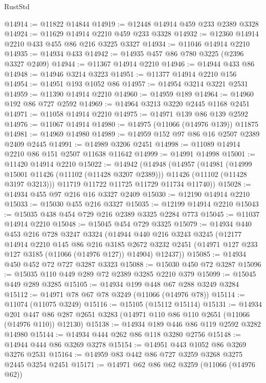 \begin{lexlean}{RustStd}
\begin{coremodule}
@14914 := @11822 @14844
@14919 := @12448 @14914 @459 @233 @2389 @3328
@14924 := @11629 @14914 @2210 @459 @233 @3328
@14932 := @12360 @14914 @2210 @433 @455 @86 @216 @3225 @3327
@14934 := @11046 @14914 @2210
@14935 := @14934 @433
@14942 := @14935 @457 @86 @780 @3225 (@2396 @3327 @2409)
@14944 := @11367 @14914 @2210
@14946 := @14944 @433 @86
@14948 := @14946 @3214 @3223
@14951 := @11377 @14914 @2210 @156
@14954 := @14951 @193 @1052 @86
@14957 := @14954 @3214 @3221 @2531
@14959 := @11390 @14914 @2210
@14960 := @14959 @189
@14964 := @14960 @192 @86 @727 @2592
@14969 := @14964 @3213 @3220 @2445 @1168 @2451
@14971 := @11058 @14914 @2210
@14975 := @14971 @139 @86 @139 @2592
@14976 := @11067 @14914
@14980 := @14975 (@11066 (@14976 @139)) @11875
@14981 := @14969 @14980
@14989 := @14959 @152 @97 @86 @16 @2507 @2389 @2409 @2445
@14991 := @14989 @3206 @2451
@14998 := @11089 @14914 @2210 @86 @151 @2507 @11638 @11642
@14999 := @14991 @14998
@15001 := @11420 @14914 @2210
@15022 := @14942
    (@14948
      (@14957
        (@14981
          (@14999 @15001 @11426 (@11102 (@11428 @3207 @2389)))
          @11426
          (@11102 (@11428 @3197 @3213)))
        @11719
        @11722
        @11725
        @11729
        @11734
        @11740))
@15028 := @14934 @455 @97 @216 @16 @3327 @2409
@15030 := @12190 @14914 @2210
@15033 := @15030 @455 @216 @3327
@15035 := @12199 @14914 @2210
@15043 := @15035 @438 @454 @729 @216 @2389 @3325 @2284 @773
@15045 := @11037 @14914 @2210
@15048 := @15045 @454 @729 @3325
@15079 := @14934
    @440
    @453
    @216
    @728
    @3247
    @3324
    (@14944
      @440
      @216
      @3243
      @3245
      (@12177
        @14914
        @2210
        @145
        @86
        @216
        @3185
        @2672
        @3232
        @2451
        (@14971 @127 @233 @127 @3185 (@11066 (@14976 @127)) @14904)
        @12437))
@15085 := @14934 @450 @452 @72 @727 @3287 @3323
@15088 := @15030 @450 @72 @3287
@15096 := @15035 @110 @449 @289 @72 @2389 @3285 @2210 @379
@15099 := @15045 @449 @289 @3285
@15105 := @14934 @199 @448 @67 @288 @3249 @3284
@15112 := @14971 @78 @67 @78 @3249 (@11066 (@14976 @78))
@15114 := @11074 (@11075 @3249)
@15116 := @15105 (@15112 @15114)
@15131 := @14934
    @201
    @447
    @86
    @287
    @2651
    @3283
    (@14971 @110 @86 @110 @2651 (@11066 (@14976 @110)) @12130)
@15138 := @14934 @189 @446 @86 @119 @2592 @3282 @14980
@15144 := @14934 @444 @262 @86 @118 @3280 @2756
@15148 := @14944 @444 @86 @3269 @3278
@15154 := @14951 @443 @1052 @86 @3269 @3276 @2531
@15164 := @14959 @83 @442 @86 @727 @3259 @3268 @3275 @2445 @3254 @2451
@15171 := @14971 @62 @86 @62 @3259 (@11066 (@14976 @62))

\end{coremodule}
\end{lexlean}

